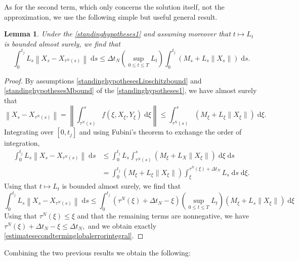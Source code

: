 \documentclass[reqno,12pt]{amsart}
\theoremstyle{plain} %
\newtheorem{lemma}{Lemma}[section]
\theoremstyle{definition} %
\begin{document}
As for the second term, which only concerns the solution itself, not the approximation, we use the following simple but useful general result.

\begin{lemma}
    \label{lemestimatesecondterminglobalerror}
    Under the \cref{standinghypotheses1} and assuming moreover that $t \mapsto L_t$ is bounded almost surely, we find that
    \begin{equation}
        \label{estimatesecondterminglobalerrorintegral}
        \int_0^{t_j}L_s\left\|X_s - X_{\tau^N(s)}\right\| \;\mathrm{d}s \leq \Delta t_N \left(\sup_{0\leq t \leq T} L_t \right)\int_0^{t_j} (M_s + L_s\|X_s\|) \;\mathrm{d}s.
    \end{equation}
\end{lemma}

\begin{proof}
    By assumptions \eqref{standinghypothesesLipschitzbound} and \eqref{standinghypothesesMbound} of the \cref{standinghypotheses1}, we have almost surely that
    \[
      \left\|X_s - X_{\tau^N(s)}\right\| = \left\|\int_{\tau^N(s)}^s f(\xi, X_\xi, Y_\xi)\;\mathrm{d}\xi\right\| \leq \int_{\tau^N(s)}^s (M_\xi + L_\xi\|X_\xi\|)\;\mathrm{d}\xi.
    \]
    Integrating over $[0, t_j]$ and using Fubini's theorem to exchange the order of integration,
    \begin{align*}
        \int_0^{t_j}L_s\left\|X_s - X_{\tau^N(s)}\right\| \;\mathrm{d}s & \leq \int_0^{t_j}L_s\int_{\tau^N(s)}^s (M_\xi + L_X\|X_\xi\|) \;\mathrm{d}\xi \;\mathrm{d}s \\
        & = \int_0^{t_j}(M_\xi + L_\xi\|X_\xi\|) \int_\xi^{\tau^N(\xi) + \Delta t_N} L_s\;\mathrm{d}s \;\mathrm{d}\xi.
    \end{align*}
    Using that $t \mapsto L_t$ is bounded almost surely, we find that
    \[
        \int_0^{t_j}L_s\left\|X_s - X_{\tau^N(s)}\right\| \;\mathrm{d}s \leq \int_0^{t_j} (\tau^N(\xi) + \Delta t_N - \xi) \left(\sup_{0\leq t \leq T} L_t \right)(M_\xi + L_s\|X_\xi\|) \;\mathrm{d}\xi
    \]
    Using that $\tau^N(\xi) \leq \xi$ and that the remaining terms are nonnegative, we have $\tau^N(\xi) + \Delta t_N - \xi \leq \Delta t_N,$ and we obtain exactly \eqref{estimatesecondterminglobalerrorintegral}.
\end{proof}

Combining the two previous results we obtain the following:
\end{document}
